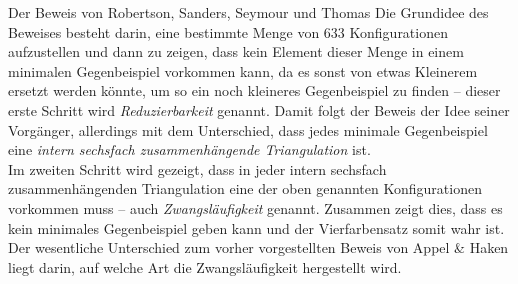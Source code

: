 \begin{chapter}{Der Beweis von Robertson, Sanders, Seymour und Thomas}
  Die Grundidee des Beweises besteht darin, eine bestimmte Menge von 633 Konfigurationen aufzustellen und dann zu zeigen, dass kein Element dieser Menge in einem minimalen Gegenbeispiel vorkommen kann, da es sonst von etwas Kleinerem ersetzt werden könnte, um so ein noch kleineres Gegenbeispiel zu finden -- dieser erste Schritt wird \textit{Reduzierbarkeit} genannt. Damit folgt der Beweis der Idee seiner Vorgänger, allerdings mit dem Unterschied, dass jedes minimale Gegenbeispiel eine \textit{intern sechsfach zusammenhängende Triangulation} ist. \\
  Im zweiten Schritt wird gezeigt, dass in jeder intern sechsfach zusammenhängenden Triangulation eine der oben genannten Konfigurationen vorkommen muss -- auch \textit{Zwangsläufigkeit} genannt. Zusammen zeigt dies, dass es kein minimales Gegenbeispiel geben kann und der Vierfarbensatz somit wahr ist. \\
  Der wesentliche Unterschied zum vorher vorgestellten Beweis von Appel \& Haken liegt darin, auf welche Art die Zwangsläufigkeit hergestellt wird.
  
  
  
  
 
\end{chapter}
